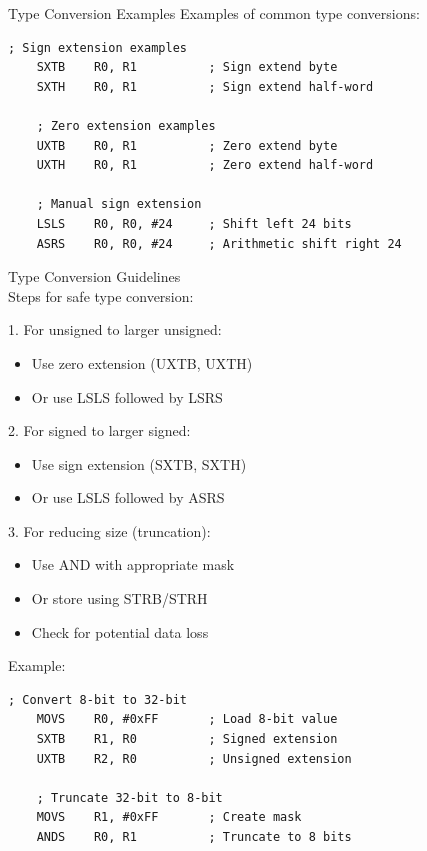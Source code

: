\begin{example2}{Type Conversion Examples}
Examples of common type conversions:
\begin{lstlisting}[language=armasm, style=base]
    ; Sign extension examples
    SXTB    R0, R1          ; Sign extend byte
    SXTH    R0, R1          ; Sign extend half-word
    
    ; Zero extension examples
    UXTB    R0, R1          ; Zero extend byte
    UXTH    R0, R1          ; Zero extend half-word
    
    ; Manual sign extension
    LSLS    R0, R0, #24     ; Shift left 24 bits
    ASRS    R0, R0, #24     ; Arithmetic shift right 24
\end{lstlisting}
\end{example2}

\begin{KR}{Type Conversion Guidelines}\\
Steps for safe type conversion:

1. For unsigned to larger unsigned:
\begin{itemize}
  \item Use zero extension (UXTB, UXTH)
  \item Or use LSLS followed by LSRS
\end{itemize}

2. For signed to larger signed:
\begin{itemize}
  \item Use sign extension (SXTB, SXTH)
  \item Or use LSLS followed by ASRS
\end{itemize}

3. For reducing size (truncation):
\begin{itemize}
  \item Use AND with appropriate mask
  \item Or store using STRB/STRH
  \item Check for potential data loss
\end{itemize}

Example:
\begin{lstlisting}[language=armasm, style=base]
    ; Convert 8-bit to 32-bit
    MOVS    R0, #0xFF       ; Load 8-bit value
    SXTB    R1, R0          ; Signed extension
    UXTB    R2, R0          ; Unsigned extension
    
    ; Truncate 32-bit to 8-bit
    MOVS    R1, #0xFF       ; Create mask
    ANDS    R0, R1          ; Truncate to 8 bits
\end{lstlisting}
\end{KR}

